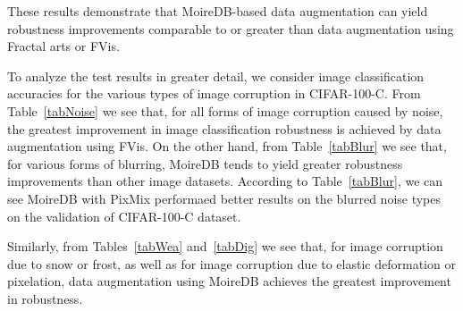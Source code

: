 These results demonstrate that MoireDB-based data augmentation
can yield robustness improvements comparable to or greater than
data augmentation using Fractal arts or FVis.

To analyze the test results in greater detail,
we consider image classification accuracies
for the various types of image corruption in CIFAR-100-C.
From Table~\ref{tabNoise} we see that, for
all forms of image corruption caused by noise,
the greatest improvement in image classification robustness
is achieved by data augmentation using FVis.
On the other hand, from Table~\ref{tabBlur} we see that,
for various forms of blurring,
MoireDB tends to yield greater robustness improvements
than other image datasets. According to Table~\ref{tabBlur}, we can see MoireDB with PixMix performaed better results on the blurred noise types on the validation of CIFAR-100-C dataset.


Similarly, from Tables~\ref{tabWea} and~\ref{tabDig}
we see that, for image corruption due to snow or frost,
as well as for image corruption due to elastic deformation
or pixelation, data augmentation using MoireDB achieves
the greatest improvement in robustness.
